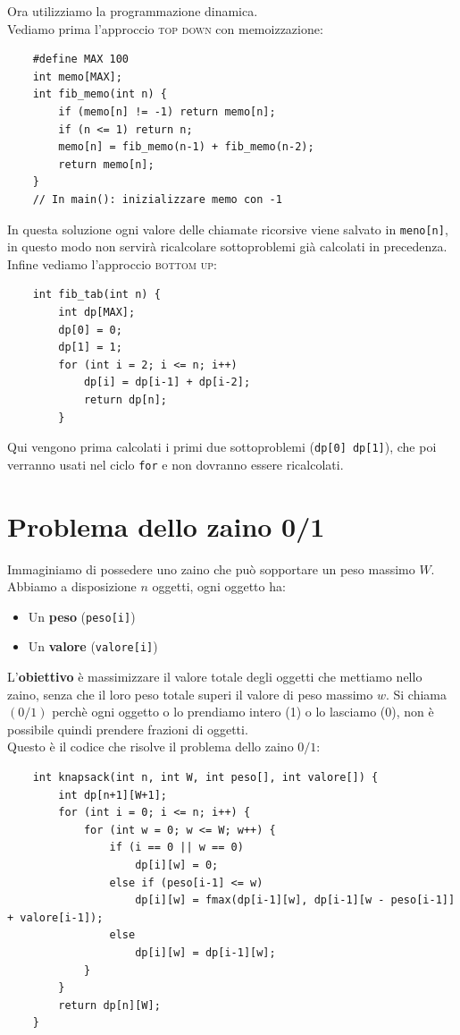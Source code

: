 \noindent Ora utilizziamo la programmazione dinamica.\\
Vediamo prima l'approccio \textsc{top down} con memoizzazione:
\begin{verbatim}
    #define MAX 100
    int memo[MAX];
    int fib_memo(int n) {
        if (memo[n] != -1) return memo[n];
        if (n <= 1) return n;
        memo[n] = fib_memo(n-1) + fib_memo(n-2);
        return memo[n];
    }
    // In main(): inizializzare memo con -1
\end{verbatim}
In questa soluzione ogni valore delle chiamate ricorsive viene salvato in \texttt{meno[n]}, in questo modo non servirà ricalcolare sottoproblemi già calcolati in precedenza.\smallskip\\

\noindent Infine vediamo l'approccio \textsc{bottom up}:
\begin{verbatim}
    int fib_tab(int n) {
        int dp[MAX];
        dp[0] = 0;
        dp[1] = 1;
        for (int i = 2; i <= n; i++)
            dp[i] = dp[i-1] + dp[i-2];
            return dp[n];
        }
\end{verbatim}
Qui vengono prima calcolati i primi due sottoproblemi (\texttt{dp[0]  dp[1]}), che poi verranno usati nel ciclo \texttt{for} e non dovranno essere ricalcolati.
    
\section{Problema dello zaino 0/1}
Immaginiamo di possedere uno zaino che può sopportare un peso massimo $W$. Abbiamo a disposizione $n$ oggetti, ogni oggetto ha:
\begin{itemize}
    \item Un \textbf{peso} (\texttt{peso[i]})
    \item Un \textbf{valore} (\texttt{valore[i]}) 
\end{itemize} 
L'\textbf{obiettivo} è massimizzare il valore totale degli oggetti che mettiamo nello zaino, senza che il loro peso totale superi il valore di peso massimo $w$. 
Si chiama $(0/1)$ perchè ogni oggetto o lo prendiamo intero (1) o lo lasciamo (0), non è possibile quindi prendere frazioni di oggetti.\smallskip\\

\noindent Questo è il codice che risolve il problema dello zaino $0/1$:
\begin{verbatim}
    int knapsack(int n, int W, int peso[], int valore[]) {
        int dp[n+1][W+1];
        for (int i = 0; i <= n; i++) {
            for (int w = 0; w <= W; w++) {
                if (i == 0 || w == 0)
                    dp[i][w] = 0;
                else if (peso[i-1] <= w)
                    dp[i][w] = fmax(dp[i-1][w], dp[i-1][w - peso[i-1]] + valore[i-1]);
                else
                    dp[i][w] = dp[i-1][w];
            }
        }
        return dp[n][W];
    }
\end{verbatim}


